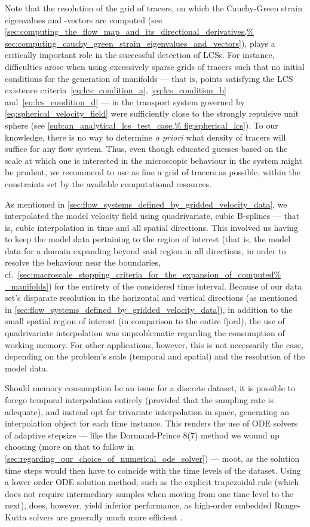 Note that the resolution of the grid of tracers, on which the Cauchy-Green
strain eigenvalues and -vectors are computed (see
\cref{sec:computing_the_flow_map_and_its_directional_derivatives,%
sec:computing_cauchy_green_strain_eigenvalues_and_vectors}), plays a critically
important role in the successful detection of LCSs. For instance, difficulties
arose when using excessively sparse grids of tracers such that no initial
conditions for the generation of manifolds --- that is, points satisfying the
LCS existence criteria~\eqref{eq:lcs_condition_a}, \eqref{eq:lcs_condition_b}
and~\eqref{eq:lcs_condition_d} --- in the transport system governed by
\cref{eq:spherical_velocity_field} were sufficiently close to the strongly
repulsive unit sphere (see \cref{sub:an_analytical_lcs_test_case,%
fig:spherical_lcs}). To our knowledge, there is no way to determine
\emph{a priori} what density of tracers will suffice for any flow system. Thus,
even though educated guesses based on the scale at which one is interested in
the microscopic behaviour in the system might be prudent, we recommend to use
as fine a grid of tracers as possible, within the constraints set by the
available computational resources.

As mentioned in \cref{sec:flow_systems_defined_by_gridded_velocity_data}, we
interpolated the model velocity field using quadrivariate, cubic B-splines ---
that is, cubic interpolation in time and all spatial directions. This involved
us having to keep the model data pertaining to the region of interest (that is,
the model data for a domain expanding beyond said region in all directions, in
order to resolve the behaviour near the boundaries, cf.\
\cref{sec:macroscale_stopping_criteria_for_the_expansion_of_computed%
_manifolds}) for the entirety of the considered time interval. Because of our
data set's disparate resolution in the horizontal and vertical directions
(as mentioned in \cref{sec:flow_systems_defined_by_gridded_velocity_data}), in
addition to the small spatial region of interest (in comparison to the entire
fjord), the use of quadrivariate interpolation was unproblematic regarding
the consumption of working memory. For other applications, however, this is not
necessarily the case, depending on the problem's scale (temporal and spatial)
and the resolution of the model data.

Should memory consumption be an issue for a discrete dataset, it is possible
to forego temporal interpolation entirely (provided that the sampling rate
is adequate), and instead opt for trivariate interpolation in space, generating
an interpolation object for each time instance. This renders the use of
ODE solvers of adaptive stepsize --- like the Dormand-Prince 8(7) method we
wound up choosing (more on that to follow in
\cref{sec:regarding_our_choice_of_numerical_ode_solver}) --- moot, as the
solution time steps would then have to coincide with the time levels of the
dataset. Using a lower order ODE solution method, such as the explicit
trapezoidal rule (which does not require intermediary samples when moving from
one time level to the next), does, however, yield inferior performance, as
high-order embedded Runge-Kutta solvers are generally much more efficient
\parencite{loken2017sensitivity}.



